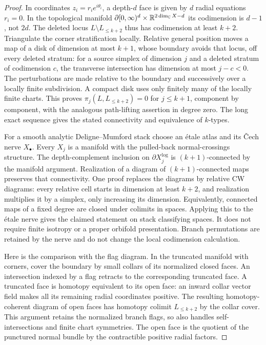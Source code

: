 \begin{proof}
In coordinates $z_i=r_i e^{i\theta_i}$, a depth-$d$ face is given by
$d$ radial equations $r_i=0$.  In the topological manifold
$\partial[0,\infty)^d\times\mathbb R^{2\dim_\mathbb C X-d}$ its codimension is
$d-1$, not $2d$.  The deleted locus $L\setminus L_{\le k+2}$ thus has
codimension at least $k+2$.  Triangulate the corner stratification locally.
Relative general position moves a map of a disk of dimension at most
$k+1$, whose boundary avoids that locus, off every deleted stratum:
for a source simplex of dimension $j$ and a deleted stratum of
codimension $c$, the transverse intersection has dimension at most
$j-c<0$.  The perturbations are made relative to the boundary and
successively over a locally finite subdivision.  A compact disk uses
only finitely many of the locally finite charts.  This proves
$\pi_j(L,L_{\le k+2})=0$ for $j\le k+1$, component by component, with
the analogous path-lifting assertion in degree zero.  The long exact
sequence gives the stated connectivity and equivalence of $k$-types.

For a smooth analytic Deligne--Mumford stack choose an \'etale
atlas and its \v Cech nerve $X_\bullet$.  Every $X_j$ is a manifold
with the pulled-back normal-crossings structure.  The depth-complement
inclusion on $\partial X_j^{\log}$ is $(k+1)$-connected by the
manifold argument.  Realization of a diagram of $(k+1)$-connected maps
preserves that connectivity.  One proof replaces the diagrams by
relative CW diagrams: every relative cell starts in dimension at
least $k+2$, and realization multiplies it by a simplex, only increasing
its dimension.  Equivalently, connected maps of a fixed degree are
closed under colimits in spaces.  Applying this to the \'etale nerve
gives the claimed statement on stack classifying spaces.  It does not
require finite isotropy or a proper orbifold presentation.  Branch
permutations are retained by the nerve and do not change the local
codimension calculation.

Here is the comparison with the flag diagram.  In the truncated
manifold with corners, cover the boundary by small collars of its
normalized closed faces.  An intersection indexed by a flag retracts
to the corresponding truncated face.  A truncated face is homotopy
equivalent to its open face: an inward collar vector field makes all
its remaining radial coordinates positive.  The resulting
homotopy-coherent diagram of open faces has homotopy colimit
$L_{\le k+2}$ by the collar cover.  This argument retains the normalized
branch flags, so also handles self-intersections and finite chart
symmetries.  The open face is the quotient of the punctured normal
bundle by the contractible positive radial factors.


\end{proof}
